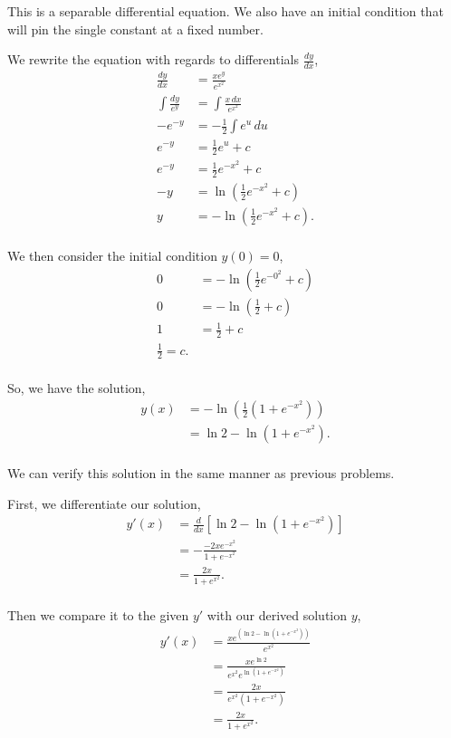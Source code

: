 \documentclass[../hw5]{subfiles}
\begin{document}
\begin{enumerate}[label= (\alph*)]
    This is a separable differential equation. We also have an initial condition that will pin the single constant at a fixed number.

    We rewrite the equation with regards to differentials $\frac{dy}{dx}$, 
    \begin{align*}
        \frac{dy}{dx}&=\frac{xe^y}{e^{x^2}} \\
        \int\frac{dy}{e^y}&=\int\frac{x\,dx}{e^{x^2}} \\
        -e^{-y}&=-\frac{1}{2}\int e^u\,du \\
        e^{-y}&=\frac{1}{2}e^u+c \\
        e^{-y}&=\frac{1}{2}e^{-x^2}+c \\
        -y&=\ln{\left( \frac{1}{2}e^{-x^2}+c \right)} \\
        y&=-\ln{\left( \frac{1}{2}e^{-x^2}+c \right)}. \\
    \end{align*}

    We then consider the initial condition $y(0)=0$,
    \begin{align*}
        0&=-\ln{\left( \frac{1}{2}e^{-0^2}+c \right)} \\
        0&=-\ln{\left( \frac{1}{2}+c \right)} \\
        1&=\frac{1}{2}+c \\
        \frac{1}{2}=c. \\
    \end{align*}

    So, we have the solution,
    \begin{align*}
        y(x)&=-\ln{\left( \frac{1}{2}(1+e^{-x^2}) \right)} \\
        &=\ln{2}-\ln{\left( 1+e^{-x^2} \right)}. \\
    \end{align*}

    We can verify this solution in the same manner as previous problems.

    First, we differentiate our solution,
    \begin{align*}
        y'(x)&=\frac{d}{dx}\left[ \ln{2}-\ln{\left( 1+e^{-x^2} \right)} \right] \\
        &=-\frac{-2xe^{-x^2}}{1+e^{-x^2}} \\
        &=\frac{2x}{1+e^{x^2}}. \\
    \end{align*}

    Then we compare it to the given $y'$ with our derived solution $y$,
    \begin{align*}
        y'(x)&=\frac{xe^{\left( \ln{2}-\ln{\left( 1+e^{-x^2} \right)} \right)}}{e^{x^2}} \\
        &=\frac{xe^{\ln{2}}}{e^{x^2}e^{\ln{\left( 1+e^{-x^2} \right)}}} \\
        &=\frac{2x}{e^{x^2}\left( 1+e^{-x^2} \right)} \\
        &=\frac{2x}{1+e^{x^2}}. \\
    \end{align*}


\end{enumerate}
\end{document}
